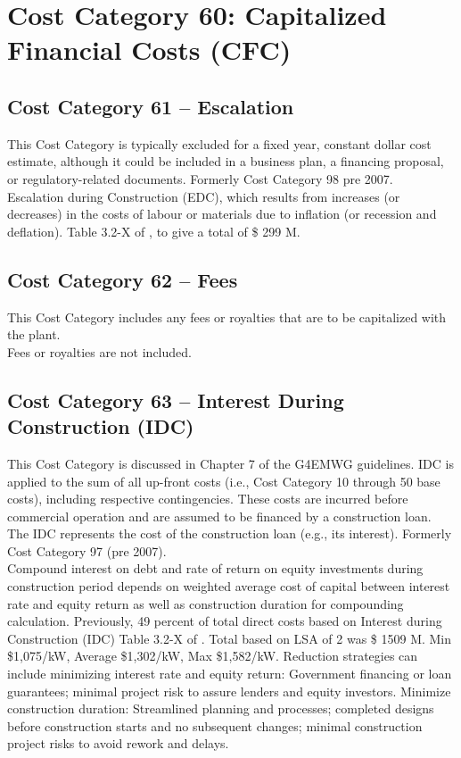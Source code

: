 \section{Cost Category 60: Capitalized Financial Costs (CFC)}

\subsection*{Cost Category 61 – Escalation}
This Cost Category is typically excluded for a fixed year, constant dollar cost estimate, although it could be included in a business plan, a financing proposal, or regulatory-related documents.  Formerly Cost Category 98 pre 2007.\\

Escalation during Construction (EDC), which results from increases (or decreases) in the costs of labour 
or materials due to inflation (or recession and deflation). Table 3.2-X of \cite{SCH78}, to give a total of \$ 299 M.

\subsection*{Cost Category 62 – Fees}
This Cost Category includes any fees or royalties that are to be capitalized with the plant.\\

Fees or royalties are not included.

\subsection*{Cost Category 63 – Interest During Construction (IDC)}
This Cost Category is discussed in Chapter 7 of the G4EMWG guidelines. IDC is applied to the sum of all up-front costs (i.e., Cost Category 10 through 50 base costs), including respective contingencies. These costs are incurred before commercial operation and are assumed to be financed by a construction loan. The IDC represents the cost of the construction loan (e.g., its interest). Formerly Cost Category 97 (pre 2007).\\

Compound interest on debt and rate of return on equity investments during construction 
period depends on weighted average cost of capital between interest rate and equity  return as well as construction duration for compounding calculation. Previously,  49 percent of total direct costs based on Interest during Construction (IDC) Table 3.2-X of \cite{SCH78}.  Total based on LSA of 2 was \$ 1509 M. Min \$1,075/kW, Average \$1,302/kW, Max \$1,582/kW. Reduction strategies can include minimizing interest rate and equity return: Government financing or loan guarantees; minimal project risk to assure lenders and equity investors. Minimize construction duration:  Streamlined planning and processes; completed designs before construction starts and no subsequent  changes; minimal construction project risks to avoid rework and delays.\\

